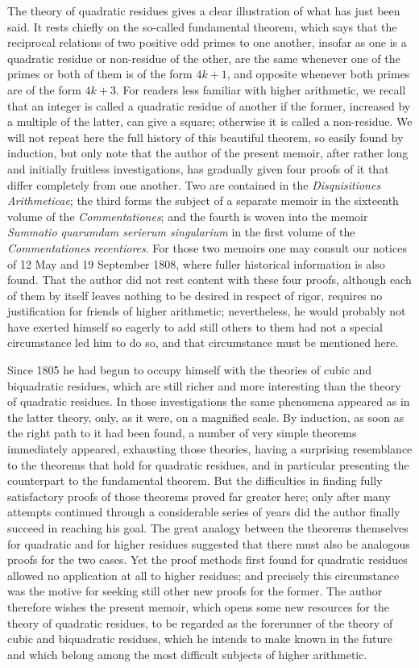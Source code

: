\documentclass[12pt]{article}
\begin{document}
The theory of quadratic residues gives a clear illustration of what has just been said. It rests chiefly on the so-called fundamental theorem, which says that the reciprocal relations of two positive odd primes to one another, insofar as one is a quadratic residue or non-residue of the other, are the same whenever one of the primes or both of them is of the form $4k+1$, and opposite whenever both primes are of the form $4k+3$. For readers less familiar with higher arithmetic, we recall that an integer is called a quadratic residue of another if the former, increased by a multiple of the latter, can give a square; otherwise it is called a non-residue. We will not repeat here the full history of this beautiful theorem, so easily found by induction, but only note that the author of the present memoir, after rather long and initially fruitless investigations, has gradually given four proofs of it that differ completely from one another. Two are contained in the \textit{Disquisitiones Arithmeticae}; the third forms the subject of a separate memoir in the sixteenth volume of the \textit{Commentationes}; and the fourth is woven into the memoir \textit{Summatio quarumdam serierum singularium} in the first volume of the \textit{Commentationes recentiores}. For those two memoirs one may consult our notices of 12 May and 19 September 1808, where fuller historical information is also found. That the author did not rest content with these four proofs, although each of them by itself leaves nothing to be desired in respect of rigor, requires no justification for friends of higher arithmetic; nevertheless, he would probably not have exerted himself so eagerly to add still others to them had not a special circumstance led him to do so, and that circumstance must be mentioned here.

Since 1805 he had begun to occupy himself with the theories of cubic and biquadratic residues, which are still richer and more interesting than the theory of quadratic residues. In those investigations the same phenomena appeared as in the latter theory, only, as it were, on a magnified scale. By induction, as soon as the right path to it had been found, a number of very simple theorems immediately appeared, exhausting those theories, having a surprising resemblance to the theorems that hold for quadratic residues, and in particular presenting the counterpart to the fundamental theorem. But the difficulties in finding fully satisfactory proofs of those theorems proved far greater here; only after many attempts continued through a considerable series of years did the author finally succeed in reaching his goal. The great analogy between the theorems themselves for quadratic and for higher residues suggested that there must also be analogous proofs for the two cases. Yet the proof methods first found for quadratic residues allowed no application at all to higher residues; and precisely this circumstance was the motive for seeking still other new proofs for the former. The author therefore wishes the present memoir, which opens some new resources for the theory of quadratic residues, to be regarded as the forerunner of the theory of cubic and biquadratic residues, which he intends to make known in the future and which belong among the most difficult subjects of higher arithmetic.
\end{document}
